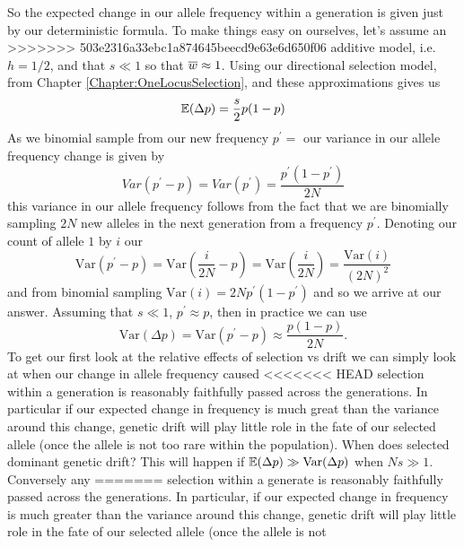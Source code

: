 So the expected change in our allele frequency within a generation is given just by our
deterministic formula. To make things easy on ourselves, let's assume an
>>>>>>> 503e2316a33ebc1a874645beecd9e63e6d650f06
additive model, i.e. $h=1/2$, and that $s \ll 1$ so that $\overline{w}
\approx 1$. Using our directional selection model, from Chapter
\ref{Chapter:OneLocusSelection}, and these approximations gives us
\begin{equation}
\mathbb{E}(\Delta p ) = \frac{s}{2} p(1-p) \label{eqn:WF_mean}
\end{equation}
As we binomial sample from our new frequency $p^{\prime}=$
our variance in our allele frequency change is given by
\begin{equation}
Var(p^{\prime} - p) = Var(p^{\prime}) = \frac{p^{\prime}(1-p^{\prime})}{2N}
\end{equation}
this variance in our allele frequency follows from the fact that we
are binomially sampling $2N$ new alleles in the next
generation from a frequency $p^{\prime}$. Denoting our count of allele $1$ by $i$ our
\begin{equation}
\textrm{Var} (p^{\prime} - p) = \textrm{Var} (\frac{i}{2N} - p) =  \textrm{Var} (\frac{i}{2N} ) =\frac{\textrm{Var} (i)}{(2N)^2}
\end{equation}
and from binomial sampling $\textrm{Var} (i) = 2N p^{\prime}(1-p^{\prime})$ and
so we arrive at our answer. Assuming that $s \ll 1$, $p^{\prime}
\approx p$, then in practice we can use
\begin{equation}
\textrm{Var} (\Delta p)  =\textrm{Var} (p^{\prime} - p) \approx \frac{p(1-p)}{2N}. \label{eqn:WF_var}
\end{equation}
To get our first look at the relative effects of selection vs drift we
can simply look at when our change in allele frequency caused
<<<<<<< HEAD
selection within a generation is reasonably faithfully passed across
the generations. In particular if our expected change in frequency is much
great than the variance around this change, genetic drift will play
little role in the fate of our selected allele (once the allele is not
too rare within the population). When does selected
dominant genetic drift? This will happen if $\mathbb{E}(\Delta p) \gg \textrm{Var}(\Delta p)$ when $Ns \gg 1$. Conversely any
=======
selection within a generate is reasonably faithfully passed across
the generations. In particular, if our expected change in frequency is much
greater than the variance around this change, genetic drift will play
little role in the fate of our selected allele (once the allele is not
